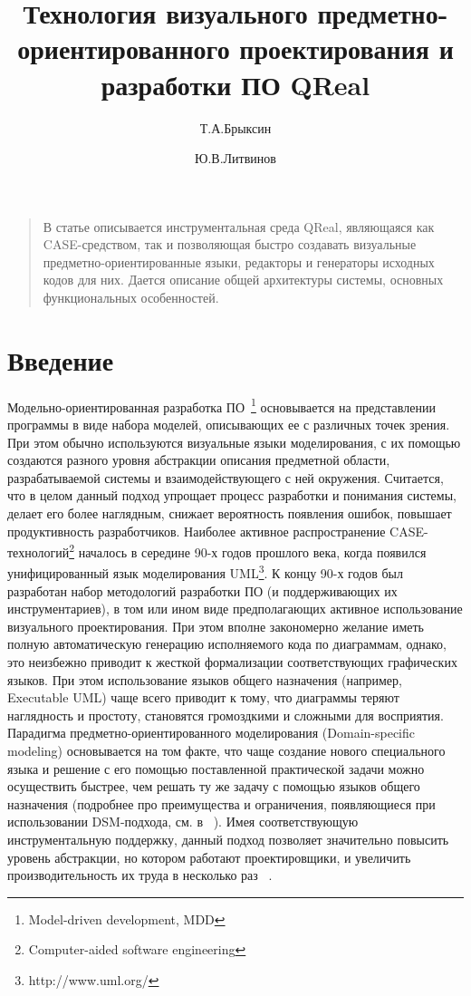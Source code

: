 \documentclass[a4paper]{article}
\title{Технология визуального предметно-ориентированного проектирования и разработки ПО QReal}
\author{Т.А.Брыксин \and Ю.В.Литвинов}
\date{}
\begin{document}
\maketitle
\thispagestyle{empty}

\begin{quote}
\small\noindent
В статье описывается инструментальная среда QReal, являющаяся как CASE-средством, так и позволяющая быстро создавать визуальные предметно-ориентированные языки, редакторы и генераторы исходных кодов для них. Дается описание общей архитектуры системы, основных функциональных особенностей. 
\end{quote}

\section*{Введение}

Модельно-ориентированная разработка ПО~\footnote{Model-driven development, MDD} основывается на представлении программы в виде набора моделей, описывающих ее с различных точек зрения. При этом обычно используются визуальные языки моделирования, с их помощью создаются разного уровня абстракции описания предметной области, разрабатываемой системы и взаимодействующего с ней окружения. Считается, что в целом данный подход упрощает процесс разработки и понимания системы, делает его более наглядным, снижает вероятность появления ошибок, повышает продуктивность разработчиков. Наиболее активное распространение CASE-технологий\footnote{Computer-aided software engineering}  началось в середине 90-х годов прошлого века, когда появился унифицированный язык моделирования UML\footnote{http://www.uml.org/}. К концу 90-х годов был разработан набор методологий разработки ПО (и поддерживающих их инструментариев), в том или ином виде предполагающих активное использование визуального проектирования. При этом вполне закономерно желание иметь полную автоматическую генерацию исполняемого кода по диаграммам, однако, это неизбежно приводит к жесткой формализации соответствующих графических языков. При этом использование языков общего назначения (например, Executable UML) чаще всего приводит к тому, что диаграммы теряют наглядность и простоту, становятся громоздкими и сложными для восприятия. Парадигма предметно-ориентированного моделирования (Domain-specific modeling) основывается на том факте, что чаще создание нового специального языка и решение с его помощью поставленной практической задачи можно осуществить быстрее, чем решать ту же задачу с помощью языков общего назначения (подробнее про преимущества и ограничения, появляющиеся при использовании DSM-подхода, см. в ~\cite{theBook}). Имея соответствующую инструментальную поддержку, данный подход позволяет значительно повысить уровень абстракции, но котором работают проектировщики, и увеличить производительность их труда в несколько раз ~\cite{dsm01}.
\end{document}
